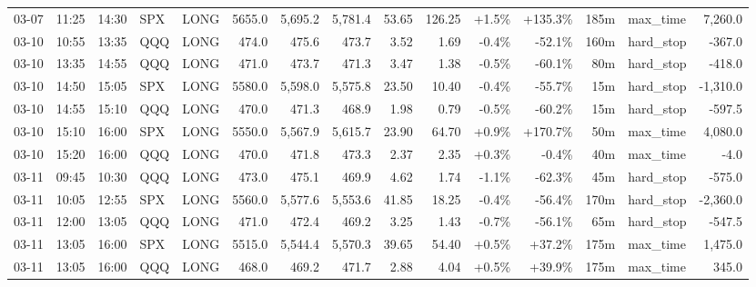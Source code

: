 \documentclass[11pt,a4paper,twoside]{article}
\begin{document}
\begin{landscape}
\begin{center}
\begin{longtable}{>{\color{txtmain}}l l l l l r r r r r r r r >{\color{txtmain}}l r}
03-07 & 11:25 & 14:30 & SPX & LONG & 5655.0 & 5,695.2 & 5,781.4 & 53.65 & 126.25 & \textcolor{wingreen}{+1.5\%} & \textcolor{wingreen}{+135.3\%} & 185m & max\_time & \textcolor{wingreen}{7,260.0} \\
03-10 & 10:55 & 13:35 & QQQ & LONG & 474.0 & 475.6 & 473.7 & 3.52 & 1.69 & \textcolor{lossred}{-0.4\%} & \textcolor{lossred}{-52.1\%} & 160m & hard\_stop & \textcolor{lossred}{-367.0} \\
03-10 & 13:35 & 14:55 & QQQ & LONG & 471.0 & 473.7 & 471.3 & 3.47 & 1.38 & \textcolor{lossred}{-0.5\%} & \textcolor{lossred}{-60.1\%} & 80m & hard\_stop & \textcolor{lossred}{-418.0} \\
03-10 & 14:50 & 15:05 & SPX & LONG & 5580.0 & 5,598.0 & 5,575.8 & 23.50 & 10.40 & \textcolor{lossred}{-0.4\%} & \textcolor{lossred}{-55.7\%} & 15m & hard\_stop & \textcolor{lossred}{-1,310.0} \\
03-10 & 14:55 & 15:10 & QQQ & LONG & 470.0 & 471.3 & 468.9 & 1.98 & 0.79 & \textcolor{lossred}{-0.5\%} & \textcolor{lossred}{-60.2\%} & 15m & hard\_stop & \textcolor{lossred}{-597.5} \\
03-10 & 15:10 & 16:00 & SPX & LONG & 5550.0 & 5,567.9 & 5,615.7 & 23.90 & 64.70 & \textcolor{wingreen}{+0.9\%} & \textcolor{wingreen}{+170.7\%} & 50m & max\_time & \textcolor{wingreen}{4,080.0} \\
03-10 & 15:20 & 16:00 & QQQ & LONG & 470.0 & 471.8 & 473.3 & 2.37 & 2.35 & \textcolor{wingreen}{+0.3\%} & \textcolor{lossred}{-0.4\%} & 40m & max\_time & \textcolor{lossred}{-4.0} \\
03-11 & 09:45 & 10:30 & QQQ & LONG & 473.0 & 475.1 & 469.9 & 4.62 & 1.74 & \textcolor{lossred}{-1.1\%} & \textcolor{lossred}{-62.3\%} & 45m & hard\_stop & \textcolor{lossred}{-575.0} \\
03-11 & 10:05 & 12:55 & SPX & LONG & 5560.0 & 5,577.6 & 5,553.6 & 41.85 & 18.25 & \textcolor{lossred}{-0.4\%} & \textcolor{lossred}{-56.4\%} & 170m & hard\_stop & \textcolor{lossred}{-2,360.0} \\
03-11 & 12:00 & 13:05 & QQQ & LONG & 471.0 & 472.4 & 469.2 & 3.25 & 1.43 & \textcolor{lossred}{-0.7\%} & \textcolor{lossred}{-56.1\%} & 65m & hard\_stop & \textcolor{lossred}{-547.5} \\
03-11 & 13:05 & 16:00 & SPX & LONG & 5515.0 & 5,544.4 & 5,570.3 & 39.65 & 54.40 & \textcolor{wingreen}{+0.5\%} & \textcolor{wingreen}{+37.2\%} & 175m & max\_time & \textcolor{wingreen}{1,475.0} \\
03-11 & 13:05 & 16:00 & QQQ & LONG & 468.0 & 469.2 & 471.7 & 2.88 & 4.04 & \textcolor{wingreen}{+0.5\%} & \textcolor{wingreen}{+39.9\%} & 175m & max\_time & \textcolor{wingreen}{345.0} \\

\end{longtable}
\end{center}
\end{landscape}
\end{document}
